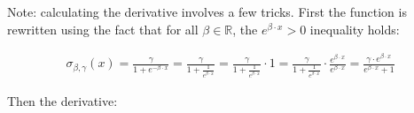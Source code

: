 \documentclass[titlepage]{article}
\begin{document}
          Note: calculating the derivative involves a few tricks. First the
          function is rewritten using the fact that for all
          $\beta \in \mathbb{R}$, the $e^{\beta \cdot x} > 0$ inequality holds:

          \begin{align*}
            \sigma_{\beta, \gamma} (x)
              = \frac{\gamma}{1 + e^{- \beta \cdot x}}
              = \frac{\gamma}{1 + \frac{1}{e^{\beta \cdot x}}}
              = \frac{\gamma}{1 + \frac{1}{e^{\beta \cdot x}}} \cdot 1
              = \frac{\gamma}{1 + \frac{1}{e^{\beta \cdot x}}}
                \cdot
                \frac{e^{\beta \cdot x}}{e^{\beta \cdot x}}
              = \frac{\gamma \cdot e^{\beta \cdot x}}{e^{\beta \cdot x} + 1}
          \end{align*}

          Then the derivative:
\end{document}
